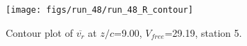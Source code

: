\begin{figure}[H]
\centering
\texttt{[image: figs/run\_48/run\_48\_R\_contour]}
\caption{Contour plot of $\overline{v_{r}}$ at $z/c$=9.00, $V_{free}$=29.19, station 5.}
\label{fig:run_48_R_contour}
\end{figure}


